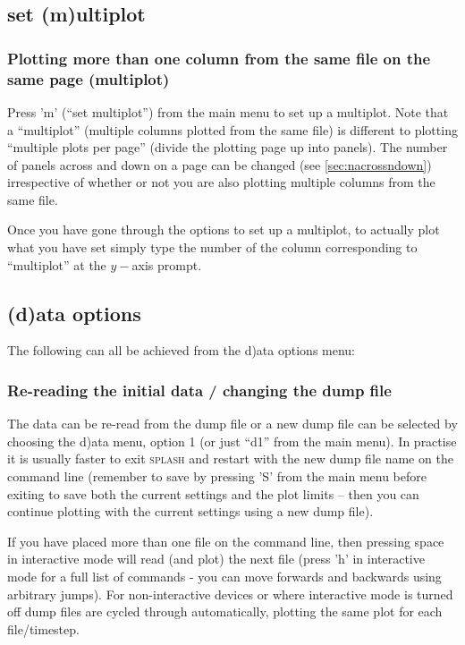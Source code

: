 \documentclass[a4paper,10pt]{article}
\newcommand{\splash}{\textsc{splash }}
\begin{document}
\subsection{set (m)ultiplot}%
\label{sec:multiplot}
\subsubsection{ Plotting more than one column from the same file on the same page (multiplot)}
 Press 'm'  (``set multiplot'') from the main menu to set up a multiplot. Note that a ``multiplot'' (multiple columns plotted from the same file) is different to plotting ``multiple plots per page'' (divide the plotting page up into panels). The number of panels across and down on a page can be changed (see \ref{sec:nacrossndown}) irrespective of whether or not you are also plotting multiple columns from the same file.

Once you have gone through the options to set up a multiplot, to actually plot what you have set simply type the number of the column corresponding to ``multiplot'' at the $y-$axis prompt.

\subsection{(d)ata options}%
The following can all be achieved from the d)ata options menu:

\subsubsection{ Re-reading the initial data / changing the dump file}
\label{sec:d1}
 The data can be re-read from the dump file or a new dump file can be selected by choosing  the d)ata menu, option 1 (or just ``d1'' from the main menu). In practise it is usually faster to exit \splash and restart with the new dump file name on the command line (remember to save by pressing 'S' from the main menu before exiting to save both the current settings and the plot limits -- then you can continue plotting with the current settings using a new dump file).
 
 If you have placed more than one file on the command line, then pressing space in interactive mode will read (and plot) the next file (press 'h' in interactive mode for a full list of commands - you can move forwards and backwards using arbitrary jumps). For non-interactive devices or where interactive mode is turned off dump files are cycled through automatically, plotting the same plot for each file/timestep.
 
\end{document}
